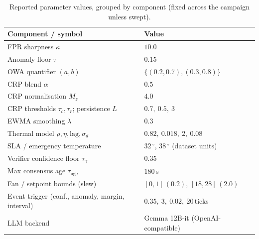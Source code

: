 \begin{table}[H]
\centering
\caption{Reported parameter values, grouped by component (fixed across the
campaign unless swept).}
\label{tab:params}
\footnotesize
\setlength{\tabcolsep}{4pt}
\begin{tabularx}{\textwidth}{P{0.52\textwidth}Y}
\toprule
\textbf{Component / symbol} & \textbf{Value} \\
\midrule
FPR sharpness $\kappa$ & $10.0$ \\
Anomaly floor $\underline{\tau}$ & $0.15$ \\
OWA quantifier $(a,b)$ & $\{(0.2,0.7),(0.3,0.8)\}$ \\
CRP blend $\alpha$ & $0.5$ \\
CRP normalisation $M_z$ & $4.0$ \\
CRP thresholds $\tau_c,\tau_r$; persistence $L$ & $0.7,\ 0.5,\ 3$ \\
EWMA smoothing $\lambda$ & $0.3$ \\
Thermal model $\rho,\eta,\text{lag},\sigma_d$ & $0.82,\ 0.018,\ 2,\ 0.08$ \\
SLA / emergency temperature & $32\,^\circ$, $38\,^\circ$ (dataset units) \\
Verifier confidence floor $\tau_\gamma$ & $0.35$ \\
Max consensus age $\tau_{\mathrm{age}}$ & $180$\,s \\
Fan / setpoint bounds (slew) & $[0,1]\,(0.2)$, $[18,28]\,(2.0)$ \\
Event trigger (conf., anomaly, margin, interval) & $0.35,\ 3,\ 0.02,\ 20$\,ticks \\
LLM backend & Gemma 12B-it (OpenAI-compatible) \\
\bottomrule
\end{tabularx}
\end{table}

